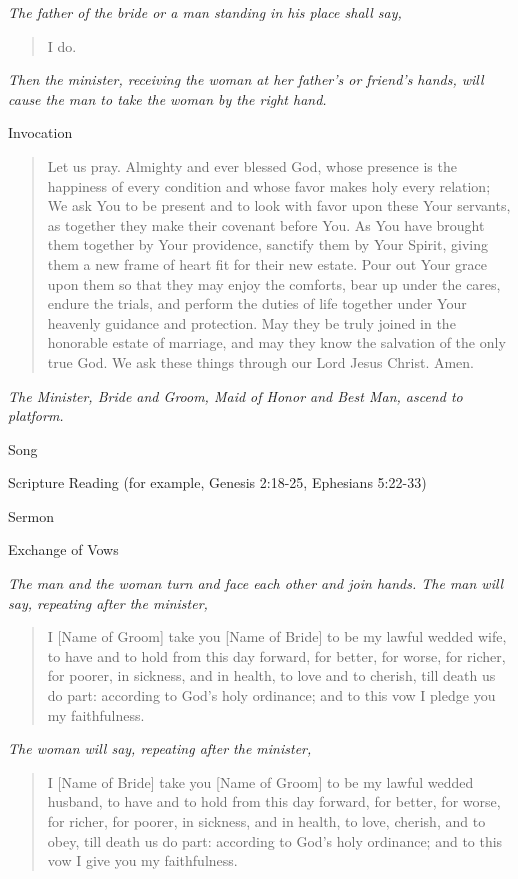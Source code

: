 \documentclass[
]{book}
\begin{document}
\emph{The father of the bride or a man standing in his place shall say,}

\begin{quote}
I do.
\end{quote}

\emph{Then the minister, receiving the woman at her father's or friend's hands, will cause the man to take the woman by the right hand.}

Invocation

\begin{quote}
Let us pray. Almighty and ever blessed God, whose presence is the happiness of every condition and whose favor makes holy every relation; We ask You to be present and to look with favor upon these Your servants, as together they make their covenant before You. As You have brought them together by Your providence, sanctify them by Your Spirit, giving them a new frame of heart fit for their new estate. Pour out Your grace upon them so that they may enjoy the comforts, bear up under the cares, endure the trials, and perform the duties of life together under Your heavenly guidance and protection. May they be truly joined in the honorable estate of marriage, and may they know the salvation of the only true God. We ask these things through our Lord Jesus Christ. Amen.
\end{quote}

\emph{The Minister, Bride and Groom, Maid of Honor and Best Man, ascend to platform.}

Song

Scripture Reading (for example, Genesis 2:18-25, Ephesians 5:22-33)

Sermon

Exchange of Vows

\emph{The man and the woman turn and face each other and join hands. The man will say, repeating after the minister,}

\begin{quote}
I {[}Name of Groom{]} take you {[}Name of Bride{]} to be my lawful wedded wife, to have and to hold from this day forward, for better, for worse, for richer, for poorer, in sickness, and in health, to love and to cherish, till death us do part: according to God's holy ordinance; and to this vow I pledge you my faithfulness.
\end{quote}

\emph{The woman will say, repeating after the minister,}

\begin{quote}
I {[}Name of Bride{]} take you {[}Name of Groom{]} to be my lawful wedded husband, to have and to hold from this day forward, for better, for worse, for richer, for poorer, in sickness, and in health, to love, cherish, and to obey, till death us do part: according to God's holy ordinance; and to this vow I give you my faithfulness.
\end{quote}
\end{document}
